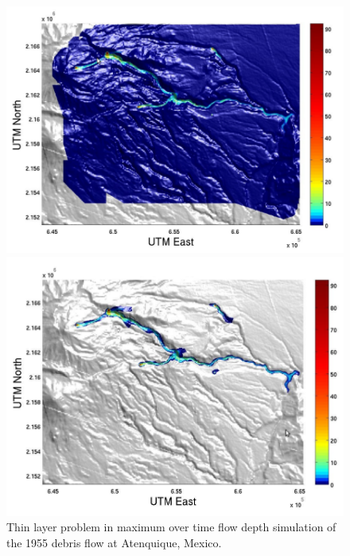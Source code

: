 \documentclass[letterpaper,10pt]{article}
\begin{document}
\begin{figure}[H]
  \begin{minipage}[b]{.5\linewidth}
    \centering
    \includegraphics[width=1\textwidth]{IMAGES/rupps1.png}
  \end{minipage}
\hspace{0.5cm}
  \begin{minipage}[b]{.5\linewidth}
    \centering
    \includegraphics[width=1\textwidth]{IMAGES/rupps2.png}
   \end{minipage}
  \caption{Thin layer problem in maximum over time flow depth simulation of the 1955 debris flow at Atenquique, Mexico.}
  \label{thinlayerproblem}
\end{figure}
\end{document}
